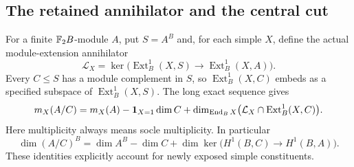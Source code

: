 \subsection{The retained annihilator and the central cut}
For a finite $\mathbb F_2B$-module $A$, put $S=A^B$ and, for each simple
$X$, define the actual module-extension annihilator
\[
 \mathcal L_X=\ker\bigl(\operatorname{Ext}^1_B(X,S)
                  \longrightarrow\operatorname{Ext}^1_B(X,A)\bigr).
\]
Every $C\leq S$ has a module complement in $S$, so
$\operatorname{Ext}^1_B(X,C)$ embeds as a specified subspace of
$\operatorname{Ext}^1_B(X,S)$. The long exact sequence gives
\begin{equation}\label{eq:exact-socle}
 m_X(A/C)=m_X(A)-\mathbf1_{X=1}\dim C+
 \dim_{\operatorname{End}_BX}\bigl(\mathcal L_X\cap\operatorname{Ext}^1_B(X,C)\bigr).
\end{equation}
Here multiplicity always means socle multiplicity. In particular
\begin{equation}\label{eq:fixed-quotient}
 \dim(A/C)^B=\dim A^B-\dim C+
 \dim\ker\bigl(H^1(B,C)\to H^1(B,A)\bigr).
\end{equation}
These identities explicitly account for newly exposed simple constituents.

